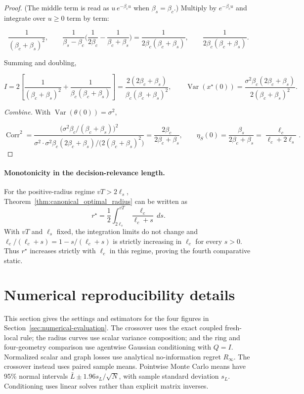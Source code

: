 \begin{proof}
(The middle term is read as $u\,e^{-\beta_c u}$ when $\beta_s=\beta_c$.) Multiply by $e^{-\beta_c u}$ and integrate over $u\ge0$ term by term:

\[
\frac{1}{(\beta_c+\beta_s)^2},\qquad \frac{1}{\beta_s-\beta_c}\Big(\frac{1}{2\beta_c}-\frac{1}{\beta_c+\beta_s}\Big)=\frac{1}{2\beta_c(\beta_c+\beta_s)},\qquad \frac{1}{2\beta_c(\beta_c+\beta_s)} .
\]

Summing and doubling,

\begin{equation}
I=2\left[\frac{1}{(\beta_c+\beta_s)^2}+\frac{1}{\beta_c(\beta_c+\beta_s)}\right]=\frac{2(2\beta_c+\beta_s)}{\beta_c(\beta_c+\beta_s)^2},\qquad \operatorname{Var}(x^\star(0))=\frac{\sigma^2\beta_c(2\beta_c+\beta_s)}{2(\beta_c+\beta_s)^2}.
\end{equation}

\emph{Combine.} With $\operatorname{Var}(\theta(0))=\sigma^2$,

\[
\operatorname{Corr}^2=\frac{\big(\sigma^2\beta_c/(\beta_c+\beta_s)\big)^2}{\sigma^2\cdot\sigma^2\beta_c(2\beta_c+\beta_s)/\big(2(\beta_c+\beta_s)^2\big)}=\frac{2\beta_c}{2\beta_c+\beta_s},\qquad \eta_S(0)=\frac{\beta_s}{2\beta_c+\beta_s}=\frac{\ell_c}{\ell_c+2\ell_s}.
\]
\end{proof}

\paragraph{Monotonicity in the decision-relevance length.}
For the positive-radius regime $vT>2\ell_s$, Theorem~\ref{thm:canonical_optimal_radius}
can be written as
\begin{equation}
r^\star=\frac12\int_{2\ell_s}^{vT}\frac{\ell_c}{\ell_c+s}\,ds.
\label{eq:rstar_integral_representation}
\end{equation}
With $vT$ and $\ell_s$ fixed, the integration limits do not change and
$\ell_c/(\ell_c+s)=1-s/(\ell_c+s)$ is strictly increasing in $\ell_c$
for every $s>0$. Thus $r^\star$ increases strictly with $\ell_c$ in this
regime, proving the fourth comparative static.

\section{Numerical reproducibility details}
\label{app:technical-numerics}
This section gives the settings and estimators for the four figures in
Section~\ref{sec:numerical-evaluation}. The crossover uses the exact coupled
fresh-local rule; the radius curves use scalar variance composition; and
the ring and four-geometry comparison use agentwise Gaussian conditioning with $Q=I$.
Normalized scalar and graph losses use analytical no-information regret
$R_\infty$. The crossover instead uses paired sample means.
Pointwise Monte Carlo means have 95\% normal intervals
$\bar L\pm1.96s_L/\sqrt N$, with sample standard deviation $s_L$.
Conditioning uses linear solves rather than explicit matrix inverses.


